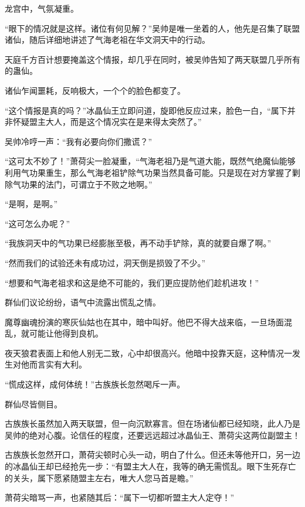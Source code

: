 
\begin{this_body}



龙宫中，气氛凝重。

“眼下的情况就是这样。诸位有何见解？”吴帅是唯一坐着的人，他先是召集了联盟诸仙，随后详细地讲述了气海老祖在华文洞天中的行动。

天庭千方百计想要掩盖这个情报，却几乎在同时，被吴帅告知了两天联盟几乎所有的蛊仙。

诸仙乍闻噩耗，反响极大，一个个的脸色都变了。

“这个情报是真的吗？”冰晶仙王立即问道，旋即他反应过来，脸色一白，“属下并非怀疑盟主大人，而是这个情况实在是来得太突然了。”

吴帅冷哼一声：“我有必要向你们撒谎？”

“这可太不妙了！”萧荷尖一脸凝重，“气海老祖乃是气道大能，既然气绝魔仙能够利用气功果重生，那么气海老祖铲除气功果当然具备可能。只是现在对方掌握了剿除气功果的法门，可谓立于不败之地啊。”

“是啊，是啊。”

“这可怎么办呢？”

“我族洞天中的气功果已经膨胀至极，再不动手铲除，真的就要自爆了啊。”

“然而我们的试验还未有成功过，洞天倒是损毁了不少。”

“想要和气海老祖求和这是绝不可能的，我们更应提防他们趁机进攻！”

群仙们议论纷纷，语气中流露出慌乱之情。

魔尊幽魂扮演的寒灰仙姑也在其中，暗中叫好。他巴不得大战来临，一旦场面混乱，就可能让他得到良机。

夜天狼君表面上和他人别无二致，心中却很高兴。他暗中投靠天庭，这种情况一发生对他而言实有大利。

“慌成这样，成何体统！”古族族长忽然喝斥一声。

群仙尽皆侧目。

古族族长虽然加入两天联盟，但一向沉默寡言。但在场诸仙都已经知晓，此人乃是吴帅的绝对心腹。论信任的程度，还要远远超过冰晶仙王、萧荷尖这两位副盟主！

古族族长忽然开口，萧荷尖顿时心头一动，明白了什么。但还未等他开口，另一边的冰晶仙王却已经抢先一步：“有盟主大人在，我等的确无需慌乱。眼下生死存亡的关头，属下愿紧随盟主左右，唯大人您马首是瞻。”

萧荷尖暗骂一声，也紧随其后：“属下一切都听盟主大人定夺！”


\end{this_body}
